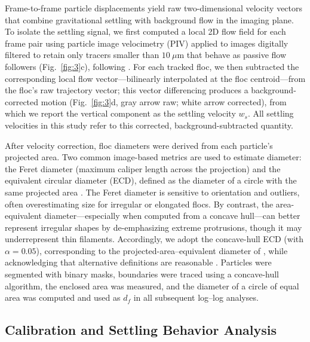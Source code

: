 \documentclass{agujournal2019}
\begin{document}
Frame-to-frame particle displacements yield raw two-dimensional velocity vectors that combine gravitational settling with background flow in the imaging plane. To isolate the settling signal, we first computed a local 2D flow field for each frame pair using particle image velocimetry (PIV) applied to images digitally filtered to retain only tracers smaller than \(10~\mu\mathrm{m}\) that behave as passive flow followers (Fig.~\ref{fig:3}c), following . For each tracked floc, we then subtracted the corresponding local flow vector—bilinearly interpolated at the floc centroid—from the floc’s raw trajectory vector; this vector differencing produces a background-corrected motion (Fig.~\ref{fig:3}d, gray arrow raw; white arrow corrected), from which we report the vertical component as the settling velocity \(w_s\). All settling velocities in this study refer to this corrected, background-subtracted quantity.


After velocity correction, floc diameters were derived from each particle’s projected area. Two common image-based metrics are used to estimate diameter: the Feret diameter (maximum caliper length across the projection) and the equivalent circular diameter (ECD), defined as the diameter of a circle with the same projected area \cite{jarvis2005measuring, smith2015image}. The Feret diameter is sensitive to orientation and outliers, often overestimating size for irregular or elongated flocs. By contrast, the area-equivalent diameter—especially when computed from a concave hull—can better represent irregular shapes by de-emphasizing extreme protrusions, though it may underrepresent thin filaments. Accordingly, we adopt the concave-hull ECD (with \(\alpha=0.05\)), corresponding to the projected-area–equivalent diameter of , while acknowledging that alternative definitions are reasonable \cite{jarvis2005measuring}. Particles were segmented with binary masks, boundaries were traced using a concave-hull algorithm, the enclosed area was measured, and the diameter of a circle of equal area was computed and used as \(d_f\) in all subsequent log–log analyses.


\subsection{Calibration and Settling Behavior Analysis}
\end{document}
